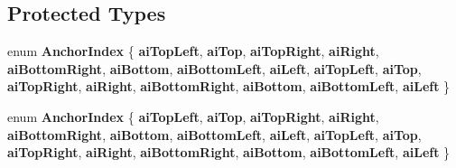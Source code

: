 \subsection*{Protected Types}
\begin{DoxyCompactItemize}
\item 
\mbox{\label{class_q_c_p_item_text_a14a84e58f72519c8ae1d7a4a1dd23f21}} 
enum {\bfseries Anchor\+Index} \{ \newline
{\bfseries ai\+Top\+Left}, 
{\bfseries ai\+Top}, 
{\bfseries ai\+Top\+Right}, 
{\bfseries ai\+Right}, 
\newline
{\bfseries ai\+Bottom\+Right}, 
{\bfseries ai\+Bottom}, 
{\bfseries ai\+Bottom\+Left}, 
{\bfseries ai\+Left}, 
\newline
{\bfseries ai\+Top\+Left}, 
{\bfseries ai\+Top}, 
{\bfseries ai\+Top\+Right}, 
{\bfseries ai\+Right}, 
\newline
{\bfseries ai\+Bottom\+Right}, 
{\bfseries ai\+Bottom}, 
{\bfseries ai\+Bottom\+Left}, 
{\bfseries ai\+Left}
 \}
\item 
\mbox{\label{class_q_c_p_item_text_a14a84e58f72519c8ae1d7a4a1dd23f21}} 
enum {\bfseries Anchor\+Index} \{ \newline
{\bfseries ai\+Top\+Left}, 
{\bfseries ai\+Top}, 
{\bfseries ai\+Top\+Right}, 
{\bfseries ai\+Right}, 
\newline
{\bfseries ai\+Bottom\+Right}, 
{\bfseries ai\+Bottom}, 
{\bfseries ai\+Bottom\+Left}, 
{\bfseries ai\+Left}, 
\newline
{\bfseries ai\+Top\+Left}, 
{\bfseries ai\+Top}, 
{\bfseries ai\+Top\+Right}, 
{\bfseries ai\+Right}, 
\newline
{\bfseries ai\+Bottom\+Right}, 
{\bfseries ai\+Bottom}, 
{\bfseries ai\+Bottom\+Left}, 
{\bfseries ai\+Left}
 \}
\end{DoxyCompactItemize}

